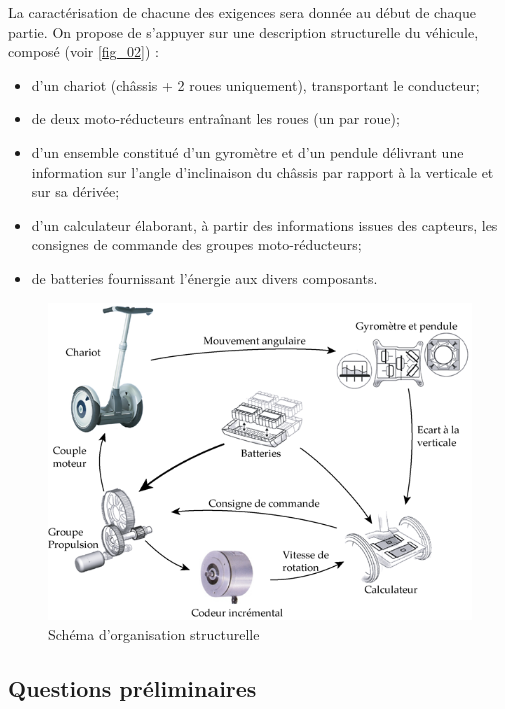 \documentclass[10pt,fleqn]{article} %
\begin{document}
La caractérisation de chacune des exigences sera donnée au début de chaque partie.
On propose de s’appuyer sur une description structurelle du véhicule, composé (voir \autoref{fig_02}) :
\begin{itemize}
\item d’un chariot (châssis + 2 roues uniquement), transportant le conducteur;
\item de deux moto-réducteurs entraînant les roues (un par roue);
\item d’un ensemble constitué d’un gyromètre et d’un pendule délivrant une information sur l’angle d’inclinaison du châssis par rapport à la verticale et sur sa dérivée;
\item d’un calculateur élaborant, à partir des informations issues des capteurs, les consignes de commande des groupes moto-réducteurs;
\item de batteries fournissant l’énergie aux divers composants.
\end{itemize}



\begin{figure}[H]
\centering
\includegraphics[width=.8\linewidth]{fig_02}
\caption{Schéma d’organisation structurelle \label{fig_02}}
\end{figure}
\fi
\subsection{Questions préliminaires}

\ifprof
\else
\end{document}
